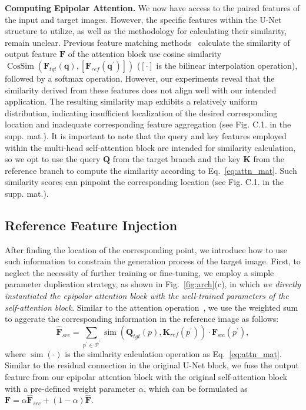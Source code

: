 \noindent\textbf{Computing Epipolar Attention.}
We now have access to the paired features of the input and target images. However, the specific features within the U-Net structure to utilize, as well as the methodology for calculating their similarity, remain unclear.
Previous feature matching methods~\cite{dift, dino-sd} calculate the similarity of output feature $\boldsymbol{F}$ of the attention block use cosine similarity $\operatorname{CosSim}(\boldsymbol{F}_{tgt}(\boldsymbol{q}), [\boldsymbol{F}_{ref}(\boldsymbol{q}^{\prime})])$ ($[\cdot]$ is the bilinear interpolation operation), followed by a softmax operation.
However, our experiments reveal that the similarity derived from these features does not align well with our intended application. The resulting similarity map exhibits a relatively uniform distribution, indicating insufficient localization of the desired corresponding location and inadequate corresponding feature aggregation (see Fig. C.1. in the supp. mat.).
It is important to note that the query and key features employed within the multi-head self-attention block are intended for similarity calculation, so we opt to use the query $\boldsymbol{Q}$ from the target branch and the key $\boldsymbol{K}$ from the reference branch to compute the similarity according to Eq.~\ref{eq:attn_mat}.
Such similarity scores can pinpoint the corresponding location (see Fig. C.1. in the supp. mat.).


\subsection{Reference Feature Injection}\label{sec:feature_use}
After finding the location of the corresponding point, we introduce how to use such information to constrain the generation process of the target image.
First, to neglect the necessity of further training or fine-tuning, we employ a simple parameter duplication strategy, as shown in Fig.~\ref{fig:arch}(c), in which \textit{we directly instantiated the epipolar attention block with the well-trained parameters of the self-attention block}.
Similar to the attention operation~\cite{transformer}, we use the weighted sum to aggerate the corresponding information in the reference image as follows:
\begin{equation}
    \hat{\boldsymbol{F}}_{src} = \sum_{p^{\prime} \in \mathcal{P}^{\prime}} \operatorname{sim}\left( \boldsymbol{Q}_{tgt}(p), \boldsymbol{K}_{ref}(p^{\prime})\right) \cdot \boldsymbol{F}_{\mathrm{src}}\left(p^{\prime}\right),
\end{equation}
where $\operatorname{sim}(\cdot)$ is the similarity calculation operation as Eq.~\ref{eq:attn_mat}.
Similar to the residual connection in the original U-Net block, we fuse the output feature from our epipolar attention block with the original self-attention block with a pre-defined weight parameter $\alpha$, which can be formulated as $\boldsymbol{F} = \alpha\hat{\boldsymbol{F}}_{src} + (1-\alpha)\hat{\boldsymbol{F}}$.

